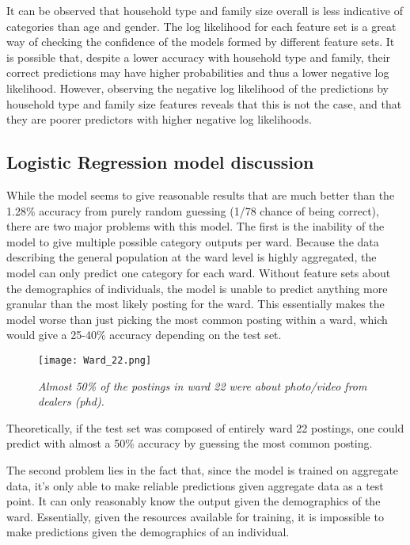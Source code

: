 \documentclass[12pt]{article}
\begin{document}
It can be observed that household type and family size overall is less indicative of categories than age and gender. The log likelihood for each feature set is a great way of checking the confidence of the models formed by different feature sets. It is possible that, despite a lower accuracy with household type and family, their correct predictions may have higher probabilities and thus a lower negative log likelihood. However, observing the negative log likelihood of the predictions by household type and family size features  reveals that this is not the case, and that they are poorer predictors with higher negative log likelihoods.

\subsection{Logistic Regression model discussion}
While the model seems to give reasonable results that are much better than the 1.28\% accuracy from purely random guessing (1/78 chance of being correct), there are two major problems with this model. The first is the inability of the model to give multiple possible category outputs per ward. Because the data describing the general population at the ward level is highly aggregated, the model can only predict one category for each ward. Without feature sets about the demographics of individuals, the model is unable to predict anything more granular than the most likely posting for the ward. This essentially makes the model worse than just picking the most common posting within a ward, which would give a 25-40\% accuracy depending on the test set. 

\begin{figure}[h]
\centering
\texttt{[image: Ward\_22.png]}
\caption{\textit{Almost 50\% of the postings in ward 22 were about photo/video from dealers (phd).}}
\end{figure}

Theoretically, if the test set was composed of entirely ward 22 postings, one could predict with almost a 50\% accuracy by guessing the most common posting.

The second problem lies in the fact that, since the model is trained on aggregate data, it's only able to make reliable predictions given aggregate data as a test point. It can only reasonably know the output given the demographics of the ward. Essentially, given the resources available for training, it is impossible to make predictions given the demographics of an individual. 
\end{document}
